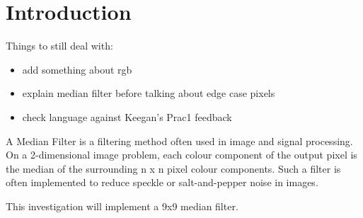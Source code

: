 \section{Introduction}
Things to still deal with:
\begin{itemize}
	\item add something about rgb 
	\item explain median filter before talking about edge case pixels
	\item check language against Keegan's Prac1 feedback
\end{itemize}
A Median Filter is a filtering method often used in image and signal processing. On a 2-dimensional image problem, each colour component of the output pixel is the median of the surrounding n x n pixel colour components. Such a filter is often implemented to reduce speckle or salt-and-pepper noise in images\cite{NSP}.

This investigation will implement a 9x9 median filter.

